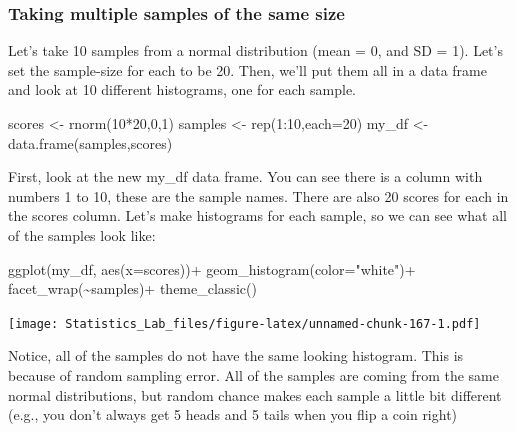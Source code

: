\documentclass[
]{book}
\newenvironment{Shaded}{\begin{snugshade}}{\end{snugshade}}
\newcommand{\AttributeTok}[1]{\textcolor[rgb]{0.77,0.63,0.00}{#1}}
\newcommand{\DecValTok}[1]{\textcolor[rgb]{0.00,0.00,0.81}{#1}}
\newcommand{\FunctionTok}[1]{\textcolor[rgb]{0.00,0.00,0.00}{#1}}
\newcommand{\NormalTok}[1]{#1}
\newcommand{\OtherTok}[1]{\textcolor[rgb]{0.56,0.35,0.01}{#1}}
\newcommand{\SpecialCharTok}[1]{\textcolor[rgb]{0.00,0.00,0.00}{#1}}
\newcommand{\StringTok}[1]{\textcolor[rgb]{0.31,0.60,0.02}{#1}}
\begin{document}
\hypertarget{taking-multiple-samples-of-the-same-size}{%
\subsubsection{Taking multiple samples of the same size}\label{taking-multiple-samples-of-the-same-size}}

Let's take 10 samples from a normal distribution (mean = 0, and SD = 1). Let's set the sample-size for each to be 20. Then, we'll put them all in a data frame and look at 10 different histograms, one for each sample.

\begin{Shaded}
\begin{Highlighting}[]
\NormalTok{scores }\OtherTok{\textless{}{-}} \FunctionTok{rnorm}\NormalTok{(}\DecValTok{10}\SpecialCharTok{*}\DecValTok{20}\NormalTok{,}\DecValTok{0}\NormalTok{,}\DecValTok{1}\NormalTok{)}
\NormalTok{samples }\OtherTok{\textless{}{-}} \FunctionTok{rep}\NormalTok{(}\DecValTok{1}\SpecialCharTok{:}\DecValTok{10}\NormalTok{,}\AttributeTok{each=}\DecValTok{20}\NormalTok{)}
\NormalTok{my\_df }\OtherTok{\textless{}{-}} \FunctionTok{data.frame}\NormalTok{(samples,scores)}
\end{Highlighting}
\end{Shaded}

First, look at the new my\_df data frame. You can see there is a column with numbers 1 to 10, these are the sample names. There are also 20 scores for each in the scores column. Let's make histograms for each sample, so we can see what all of the samples look like:

\begin{Shaded}
\begin{Highlighting}[]
\FunctionTok{ggplot}\NormalTok{(my\_df, }\FunctionTok{aes}\NormalTok{(}\AttributeTok{x=}\NormalTok{scores))}\SpecialCharTok{+}
  \FunctionTok{geom\_histogram}\NormalTok{(}\AttributeTok{color=}\StringTok{"white"}\NormalTok{)}\SpecialCharTok{+}
  \FunctionTok{facet\_wrap}\NormalTok{(}\SpecialCharTok{\textasciitilde{}}\NormalTok{samples)}\SpecialCharTok{+}
  \FunctionTok{theme\_classic}\NormalTok{()}
\end{Highlighting}
\end{Shaded}

\texttt{[image: Statistics\_Lab\_files/figure-latex/unnamed-chunk-167-1.pdf]}

Notice, all of the samples do not have the same looking histogram. This is because of random sampling error. All of the samples are coming from the same normal distributions, but random chance makes each sample a little bit different (e.g., you don't always get 5 heads and 5 tails when you flip a coin right)
\end{document}
